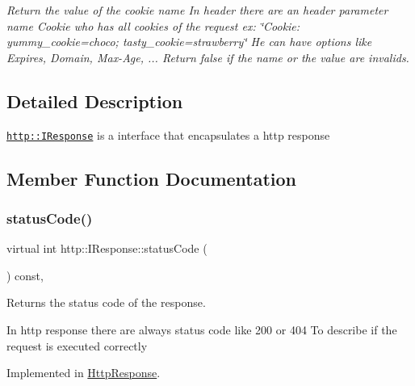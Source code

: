 \begin{DoxyCompactItemize}
\begin{DoxyCompactList}\small\item\em Return the value of the cookie \textquotesingle{}name\textquotesingle{} In header there are an header parameter name \textquotesingle{}Cookie\textquotesingle{} who has all cookies of the request ex\+: \char`\"{}\+Cookie\+: yummy\+\_\+cookie=choco; tasty\+\_\+cookie=strawberry\char`\"{} He can have options like Expires, Domain, Max-\/\+Age, ... Return false if the name or the value are invalids. \end{DoxyCompactList}\end{DoxyCompactItemize}


\subsection{Detailed Description}
\href{http::IResponse}{\tt http\+::\+I\+Response} is a interface that encapsulates a http response 

\subsection{Member Function Documentation}
\mbox{\label{structhttp_1_1IResponse_ad980a7a0b5f1de80bd1faa84706e922f}} 
\subsubsection{\texorpdfstring{status\+Code()}{statusCode()}\hspace{0.1cm}{\footnotesize\ttfamily [1/2]}}
{\footnotesize\ttfamily virtual int http\+::\+I\+Response\+::status\+Code (\begin{DoxyParamCaption}{ }\end{DoxyParamCaption}) const\hspace{0.3cm}{\ttfamily [pure virtual]}, {\ttfamily [noexcept]}}



Returns the status code of the response. 

In http response there are always status code like 200 or 404 To describe if the request is executed correctly 

Implemented in \hyperlink{classHttpResponse_a5cb28c82fc2f657808b61f0f6bb67f28}{Http\+Response}.

